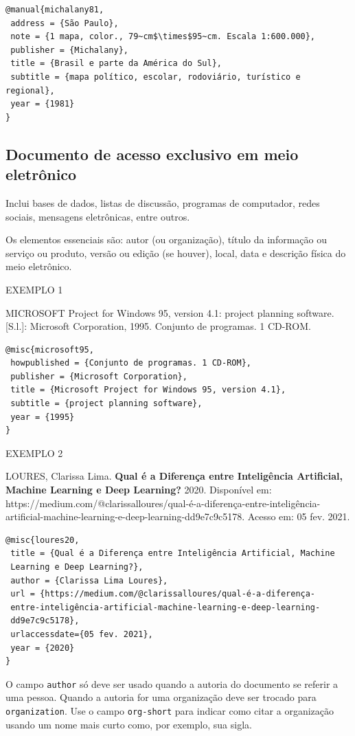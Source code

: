 \begin{verbatim}
@manual{michalany81,
 address = {São Paulo},
 note = {1 mapa, color., 79~cm$\times$95~cm. Escala 1:600.000},
 publisher = {Michalany},
 title = {Brasil e parte da América do Sul},
 subtitle = {mapa político, escolar, rodoviário, turístico e regional},
 year = {1981}
}
\end{verbatim}

\subsection{Documento de acesso exclusivo em meio eletrônico}

Inclui bases de dados, listas de discussão, programas de computador, redes sociais, mensagens eletrônicas, entre outros.

Os elementos essenciais são: autor (ou organização), título da informação ou serviço ou produto, versão ou edição (se houver), local, data e descrição física do meio eletrônico.

EXEMPLO 1 

MICROSOFT Project for Windows 95, version 4.1: project planning software. [S.l.]: Microsoft Corporation, 1995. Conjunto de programas. 1 CD-ROM.

\begin{verbatim}
@misc{microsoft95,
 howpublished = {Conjunto de programas. 1 CD-ROM},
 publisher = {Microsoft Corporation},
 title = {Microsoft Project for Windows 95, version 4.1},
 subtitle = {project planning software},
 year = {1995}
}
\end{verbatim}

EXEMPLO 2 

LOURES, Clarissa Lima. \textbf{Qual é a Diferença entre Inteligência Artificial, Machine Learning e Deep Learning?} 2020. Disponível em: https://medium.com/@clarissalloures/qual-é-a-diferença-entre-inteligência-artificial-machine-learning-e-deep-learning-dd9e7c9c5178. Acesso em: 05 fev. 2021.

\begin{verbatim}
@misc{loures20,
 title = {Qual é a Diferença entre Inteligência Artificial, Machine
 Learning e Deep Learning?},
 author = {Clarissa Lima Loures},
 url = {https://medium.com/@clarissalloures/qual-é-a-diferença-
 entre-inteligência-artificial-machine-learning-e-deep-learning-
 dd9e7c9c5178},
 urlaccessdate={05 fev. 2021},
 year = {2020}
}
\end{verbatim}

O campo \verb|author| só deve ser usado quando a autoria do documento se referir a uma pessoa. Quando a autoria for uma organização deve ser trocado para \verb|organization|. Use o campo \verb|org-short| para indicar como citar a organização usando um nome mais curto como, por exemplo, sua sigla.\\

